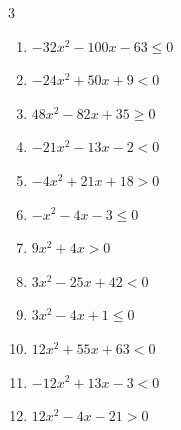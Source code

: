 \begin{multicols}{3}
\begin{enumerate}
  \item $-32x^{2}-100x-63\leq 0$


\columnbreak %

  \item $-24x^{2}+50x+9<0$


  \item $48x^{2}-82x+35\geq 0$


  \item $-21x^{2}-13x-2<0$


  \item $-4x^{2}+21x+18>0$


  \item $-x^{2}-4x-3\leq 0$

        \phantom{$\displaystyle x \leqq -3 , \; -1 \leqq x$}

  \item $9x^{2}+4x>0$


  \item $3x^{2}-25x+42<0$


  \item $3x^{2}-4x+1\leq 0$


  \item $12x^{2}+55x+63<0$


  \item $-12x^{2}+13x-3<0$


\columnbreak %

  \item $12x^{2}-4x-21>0$


\end{enumerate}
\end{multicols}
